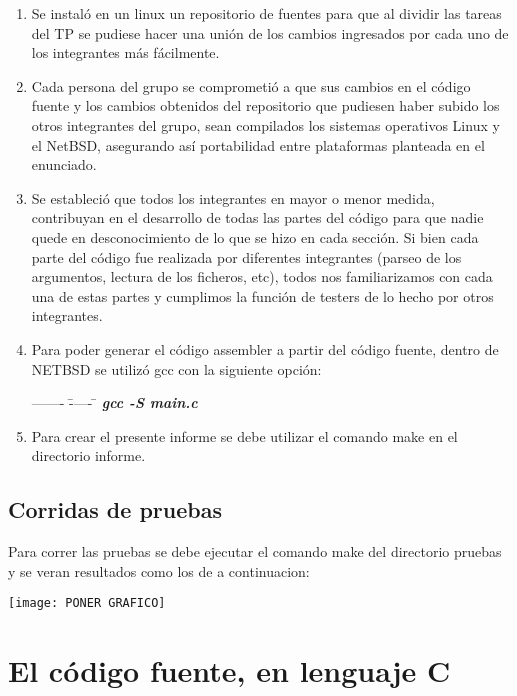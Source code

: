 \documentclass[a4paper,10pt]{article}
\begin{document}
\begin{enumerate}
\item Se instaló en un linux un repositorio de fuentes 
para que al dividir las tareas del TP se pudiese hacer una unión de
los cambios ingresados por cada uno de los integrantes más fácilmente. 
\item Cada persona del grupo se comprometió a que sus cambios en el código
fuente y los cambios obtenidos del repositorio que pudiesen haber subido los
otros integrantes del grupo, sean compilados los sistemas operativos Linux y el NetBSD, asegurando así portabilidad entre plataformas planteada en el enunciado. 
\item Se estableció que todos los integrantes en mayor o menor medida, 
contribuyan en el desarrollo de todas las partes del código para que 
nadie quede en desconocimiento de lo que se hizo en cada sección. 
Si bien cada parte del código fue realizada por diferentes integrantes (parseo
de los argumentos, lectura de los ficheros, etc), todos nos 
familiarizamos con cada una de estas partes y cumplimos la función 
de testers de lo hecho por otros integrantes. 
\item Para poder generar el código assembler a partir del código fuente, 
dentro de NETBSD se utilizó gcc con la siguiente opción: 
	\begin{tabbing}
	------- \= ----- \= \kill
	\> \textbf{\emph{gcc -S main.c}}\\ 
	\end{tabbing}
\item Para crear el presente informe se debe utilizar el comando make en el directorio informe.
\end{enumerate}

\newpage{}
\subsection{{\normalsize Corridas de pruebas}}
	Para correr las pruebas se debe ejecutar el comando make del directorio pruebas y se veran resultados como los de 
	a continuacion:
	\newline
	\begin{center}
		\texttt{[image: PONER GRAFICO]}
	\end{center}	
	
\newpage
\section{{\normalsize El código fuente, en lenguaje C}}
\end{document}
